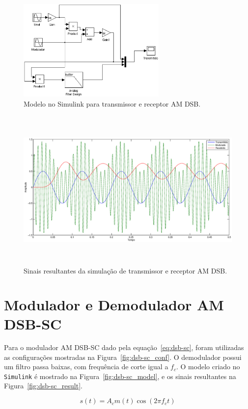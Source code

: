 \documentclass{article}
\begin{document}
\begin{figure}[h]
   \centering
   \includegraphics[height=5cm]{dsb_model}
   \caption{Modelo no Simulink para transmissor e receptor AM DSB.}
   \label{fig:dsb_model}
\end{figure}
\begin{figure}[h]
   \centering
   \includegraphics[height=8cm]{dsb_result}
   \caption{Sinais resultantes da simulação de transmissor e receptor AM DSB.}
   \label{fig:dsb_result}
\end{figure}

\section{Modulador e Demodulador AM DSB-SC}
Para o modulador AM DSB-SC dado pela equação~\ref{eq:dsb-sc}, foram utilizadas as configurações
mostradas na Figura~\ref{fig:dsb-sc_conf}. O demodulador possui um filtro passa baixas, com 
frequência de corte igual a $f_c$. O modelo criado no \texttt{Simulink} é mostrado na
Figura~\ref{fig:dsb-sc_model}, e os sinais resultantes na Figura~\ref{fig:dsb-sc_result}.

\begin{equation}\label{eq:dsb-sc}
s(t)=A_cm(t)\cos(2\pi f_ct)
\end{equation}
\end{document}
